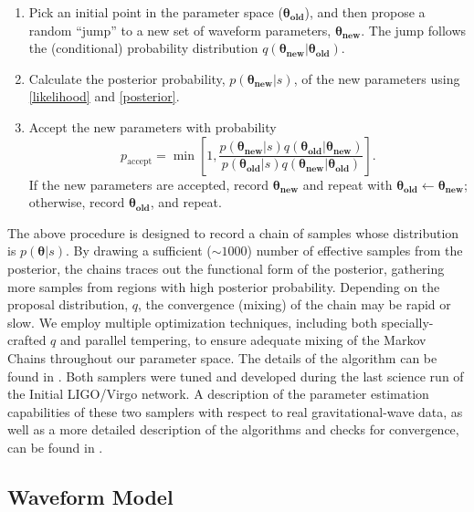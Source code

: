 \documentclass[11pt,a4paper]{emulateapj}
\newcommand{\thpara}{\boldsymbol{\theta}}
\begin{document}
\begin{enumerate}
\item Pick an initial point in the parameter space
  ($\boldsymbol{\theta_{\text{old}}}$), and then propose a random
  ``jump'' to a new set of waveform parameters,
  $\boldsymbol{\theta_{\text{new}}}$.  The jump follows the
  (conditional) probability distribution $q\left(
  \boldsymbol{\theta_{\text{new}}} | \boldsymbol{\theta_{\text{old}}}
  \right)$.
\item Calculate the posterior probability,
  $p(\boldsymbol{\theta_{\text{new}}}|s)$, of the new parameters using
  \eqref{likelihood} and \eqref{posterior}.
\item Accept the new parameters with probability 
  \begin{equation}
    p_\mathrm{accept} = \min \left[ 1, \frac{p(\boldsymbol{\theta_{\text{new}}}|s) q\left(\boldsymbol{\theta_{\text{old}}} | \boldsymbol{\theta_{\text{new}}} \right)}{p(\boldsymbol{\theta_{\text{old}}}|s) q\left(\boldsymbol{\theta_{\text{new}}} | \boldsymbol{\theta_{\text{old}}} \right)} \right].
  \end{equation}
  If the new parameters are accepted, record
  $\boldsymbol{\theta_\text{new}}$ and repeat with
  $\boldsymbol{\theta_\text{old}} \gets
  \boldsymbol{\theta_\text{new}}$; otherwise, record
  $\boldsymbol{\theta_\text{old}}$, and repeat.
\end{enumerate} 
  
The above procedure is designed to record a chain of samples whose
distribution is $p\left(\thpara|s\right)$.  By drawing a sufficient ($\sim 1000$) number
 of effective samples from the posterior, the chains traces out the functional form of the posterior,
 gathering more samples from regions with high posterior probability.  Depending on
the proposal distribution, $q$, the convergence (mixing) of the chain
may be rapid or slow.  We employ multiple optimization techniques,
including both specially-crafted $q$ and parallel tempering, to ensure
adequate mixing of the Markov Chains throughout our parameter space.
The details of the algorithm can be found in
\citep{Sluys08,spinspiral2009, spinspiral2010}.  Both samplers were tuned and 
developed during the last science run of the Initial LIGO/Virgo network.  
A description of the parameter estimation capabilities of these two samplers with respect to
real gravitational-wave data, as well as a more detailed description of the algorithms and
checks for convergence, can be found in \cite{S6PE}.
  
 
\subsection{Waveform Model}
\label{waveformSection}
  
\end{document}
